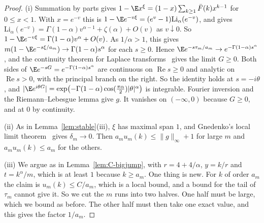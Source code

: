 \begin{proof}
(i) Summation by parts gives $1-\E x^\xi=(1-x)\sum_{k\ge1}\bar F(k)x^{k-1}$ for
$0\le x<1$. With $x=e^{-v}$ this is
$1-\E e^{-v\xi}=(e^v-1)\mathrm{Li}_\alpha(e^{-v})$, and \cite[25.12.12]{dlmf} gives
$\mathrm{Li}_\alpha(e^{-v})=\Gamma(1-\alpha)v^{\alpha-1}+\zeta(\alpha)+O(v)$ as
$v\downarrow0$. So $1-\E e^{-v\xi}=\Gamma(1-\alpha)v^\alpha+O(v)$. As $1/\alpha>1$, this
gives $m(1-\E e^{-s\xi/a_m})\to\Gamma(1-\alpha)s^\alpha$ for each $s\ge0$. Hence
$\E e^{-s\tau_m/a_m}\to e^{-\Gamma(1-\alpha)s^\alpha}$, and the continuity theorem for
Laplace transforms~\cite[Section~XIII.1]{feller1971} gives the limit $G\ge0$. Both
sides of $\E e^{-sG}=e^{-\Gamma(1-\alpha)s^\alpha}$ are continuous on
$\operatorname{Re}s\ge0$ and analytic on $\operatorname{Re}s>0$, with the principal
branch on the right. So the identity holds at $s=-i\theta$, and
$\lvert\E e^{i\theta G}\rvert=\exp\bigl(-\Gamma(1-\alpha)\cos(\frac{\pi\alpha}2)\lvert
\theta\rvert^\alpha\bigr)$ is integrable. Fourier inversion and the Riemann--Lebesgue
lemma give $g$. It vanishes on $(-\infty,0)$ because $G\ge0$, and at $0$ by continuity.

(ii) As in Lemma~\ref{lem:stable}(iii), $\xi$ has maximal span $1$, and Gnedenko's local
limit theorem~\cite[Theorem~4.2.1]{ibragimovlinnik1971} gives $\delta_m\to0$. Then
$a_mu_m(k)\le\lVert g\rVert_\infty+1$ for large $m$ and $a_mu_m(k)\le a_m$ for the
others.

(iii) We argue as in Lemma~\ref{lem:C-bigjump}, with $r=4+4/\alpha$, $y=k/r$ and
$t=k^\alpha/m$, which is at least $1$ because $k\ge a_m$. One thing is new. For $k$ of
order $a_m$ the claim is $u_m(k)\le C/a_m$, which is a local bound, and a bound for the
tail of $\tau_m$ cannot give it. So we cut the $m$ runs into two halves. One half must be
large, which we bound as before. The other half must then take one exact value, and this
gives the factor $1/a_m$.


\end{proof}
